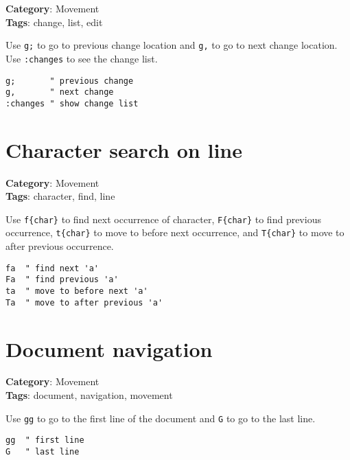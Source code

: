 {{{{{{\textbf{Category}: Movement\\ \textbf{Tags}: change, list, edit
\vspace{0.5cm}

Use {\footnotesize \Verb§g;§} to go to previous change location and {\footnotesize \Verb§g,§} to go to next change location. Use {\footnotesize \Verb§:changes§} to see the change list.

\begin{Exa*}{}
\begin{Verbatim}[fontsize=\footnotesize, breaklines, breakanywhere]
g;       " previous change
g,       " next change
:changes " show change list
\end{Verbatim}
\end{Exa*}

\section{Character search on line}

\textbf{Category}: Movement\\ \textbf{Tags}: character, find, line
\vspace{0.5cm}

Use {\footnotesize \Verb§f{char}§} to find next occurrence of character, {\footnotesize \Verb§F{char}§} to find previous occurrence, {\footnotesize \Verb§t{char}§} to move to before next occurrence, and {\footnotesize \Verb§T{char}§} to move to after previous occurrence.

\begin{Exa*}{}
\begin{Verbatim}[fontsize=\footnotesize, breaklines, breakanywhere]
fa  " find next 'a'
Fa  " find previous 'a'
ta  " move to before next 'a'
Ta  " move to after previous 'a'
\end{Verbatim}
\end{Exa*}

\section{Document navigation}

\textbf{Category}: Movement\\ \textbf{Tags}: document, navigation, movement
\vspace{0.5cm}

Use {\footnotesize \Verb§gg§} to go to the first line of the document and {\footnotesize \Verb§G§} to go to the last line.

\begin{Exa*}{}
\begin{Verbatim}[fontsize=\footnotesize, breaklines, breakanywhere]
gg  " first line
G   " last line
\end{Verbatim}
\end{Exa*}

}}}}}}
